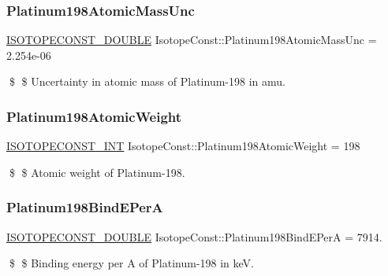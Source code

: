\subsubsection{\texorpdfstring{Platinum198\+Atomic\+Mass\+Unc}{Platinum198AtomicMassUnc}}
{\footnotesize\ttfamily \mbox{\hyperlink{group___isotope_const-_macros_ga8f45a7272ce02c0b4c65c44636ed719a}{I\+S\+O\+T\+O\+P\+E\+C\+O\+N\+S\+T\+\_\+\+D\+O\+U\+B\+LE}} Isotope\+Const\+::\+Platinum198\+Atomic\+Mass\+Unc = 2.\+254e-\/06}

\$ \$ Uncertainty in atomic mass of Platinum-\/198 in amu. \mbox{\label{group___isotope_const-_platinum-_pt198_gafdc54bb5aea61cce78cb17b5af01b000}} 
\subsubsection{\texorpdfstring{Platinum198\+Atomic\+Weight}{Platinum198AtomicWeight}}
{\footnotesize\ttfamily \mbox{\hyperlink{group___isotope_const-_macros_ga5f18360b3e99483a35c32d789e62621c}{I\+S\+O\+T\+O\+P\+E\+C\+O\+N\+S\+T\+\_\+\+I\+NT}} Isotope\+Const\+::\+Platinum198\+Atomic\+Weight = 198}

\$ \$ Atomic weight of Platinum-\/198. \mbox{\label{group___isotope_const-_platinum-_pt198_ga04900c2bad53e1246890a1d7d27db4ae}} 
\subsubsection{\texorpdfstring{Platinum198\+Bind\+E\+PerA}{Platinum198BindEPerA}}
{\footnotesize\ttfamily \mbox{\hyperlink{group___isotope_const-_macros_ga8f45a7272ce02c0b4c65c44636ed719a}{I\+S\+O\+T\+O\+P\+E\+C\+O\+N\+S\+T\+\_\+\+D\+O\+U\+B\+LE}} Isotope\+Const\+::\+Platinum198\+Bind\+E\+PerA = 7914.}

\$ \$ Binding energy per A of Platinum-\/198 in keV. \mbox{\label{group___isotope_const-_platinum-_pt198_ga8050292944f5bc889a7f511fd97bee25}} 
